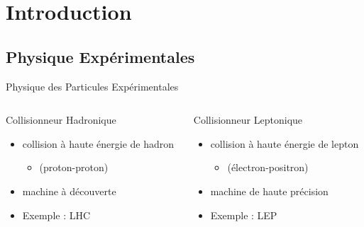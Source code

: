 \documentclass[9pt]{beamer}
\begin{document}
\section{Introduction}

\subsection{Physique Expérimentales}

\begin{frame}{Physique des Particules Expérimentales}

	\begin{columns}
	\begin{column}{0.45\textwidth}

	\begin{block}{Collisionneur Hadronique}
		\begin{itemize}
			\item collision à haute énergie de hadron 
			\begin{itemize}
				\item (proton-proton)
			\end{itemize}
			\item machine à découverte 
			\item Exemple : LHC 
		\end{itemize}
	\end{block}
	
	\end{column}
	\begin{column}{0.45\textwidth}
	
	\begin{block}{Collisionneur Leptonique}
		\begin{itemize}
			\item collision à haute énergie de lepton
			\begin{itemize}
				\item (électron-positron)
			\end{itemize}
			\item machine de haute précision
			\item Exemple : LEP 
		\end{itemize}
	\end{block}
	
	\end{column}
	\end{columns}
	
\end{frame}
\end{document}
